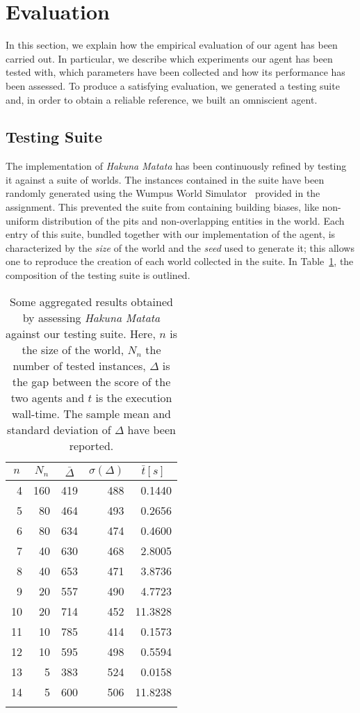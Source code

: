 \documentclass{llncs}
\newcommand{\hm}{\emph{Hakuna Matata}\xspace}
\begin{document}
\section{Evaluation}

In this section, we explain how the empirical evaluation of our agent has been carried out.
In particular, we describe which experiments our agent has been tested with, which parameters have been collected and how its performance has been assessed.
To produce a satisfying evaluation, we generated a testing suite and, in order to obtain a reliable reference, we built an omniscient agent.

\subsection{Testing Suite}

The implementation of \hm has been continuously refined by testing it against a suite of worlds.
The instances contained in the suite have been randomly generated using the Wumpus World Simulator~\cite{WWS} provided in the assignment.
This prevented the suite from containing building biases, like non-uniform distribution of the pits and non-overlapping entities in the world.
Each entry of this suite, bundled together with our implementation of the agent, is characterized by the \emph{size} of the world and the \emph{seed} used to generate it; this allows one to reproduce the creation of each world collected in the suite.
In Table~\ref{tbl:test}, the composition of the testing suite is outlined.

\begin{table}[t]
	\label{tbl:test}
	\centering
	\begin{tabular}{rrrrr}
	\toprule
	\multicolumn{1}{c}{$n$} & \multicolumn{1}{c}{$N_n$} & \multicolumn{1}{c}{$\bar{\Delta}$} & \multicolumn{1}{c}{$\sigma(\Delta)$} & \multicolumn{1}{c}{$\bar{t} [s]$}\\
	\midrule
	 4 & 160 & 419 & 488 &  0.1440 \\
	 5 &  80 & 464 & 493 &  0.2656 \\
	 6 &  80 & 634 & 474 &  0.4600 \\
	 7 &  40 & 630 & 468 &  2.8005 \\
	 8 &  40 & 653 & 471 &  3.8736 \\
	 9 &  20 & 557 & 490 &  4.7723 \\
	10 &  20 & 714 & 452 & 11.3828 \\
	11 &  10 & 785 & 414 &  0.1573 \\
	12 &  10 & 595 & 498 &  0.5594 \\
	13 &   5 & 383 & 524 &  0.0158 \\
	14 &   5 & 600 & 506 & 11.8238 \\
	\bottomrule\\
	\end{tabular}
	\caption{Some aggregated results obtained by assessing \hm against our testing suite. Here, $n$ is the size of the world, $N_n$ the number of tested instances, $\Delta$ is the gap between the score of the two agents and $t$ is the execution wall-time. The sample mean and standard deviation of $\Delta$ have been reported.}
\end{table}
\end{document}
